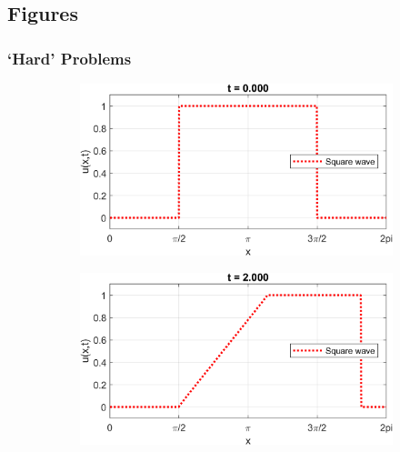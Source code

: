 \documentclass{myproject}
\begin{document}
\subsection{Figures}

\subsubsection{`Hard' Problems}

\begin{figure}[h]
    \centering
    \begin{subfigure}[b]{0.40\textwidth}
       \includegraphics[width=1\linewidth]{square_wave_0.png}
       \caption{}
    \end{subfigure}\qquad
    \begin{subfigure}[b]{0.40\textwidth}
       \includegraphics[width=1\linewidth]{square_wave_2.png}
       \caption{}
    \end{subfigure}

    \vspace{\floatsep}


\end{figure}
\end{document}
